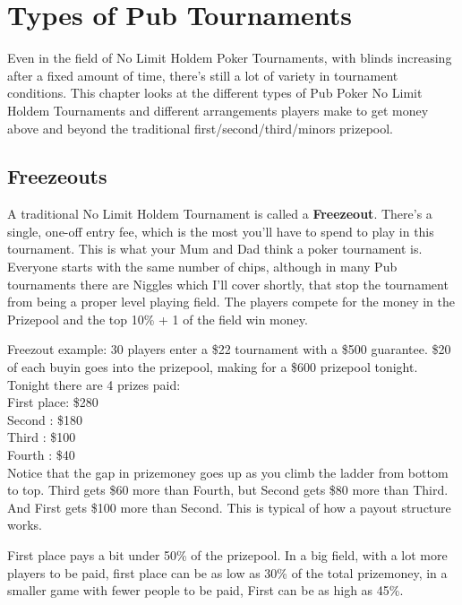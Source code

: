 \chapter{Types of Pub Tournaments}


Even in the field of No Limit Holdem Poker Tournaments,
with blinds increasing after a fixed amount of time, there's still a
lot of variety in tournament conditions. This chapter
looks at the different types of Pub Poker No Limit Holdem Tournaments
and different arrangements players make to get money above and
beyond the traditional first/second/third/minors prizepool.

\section{Freezeouts}

A traditional No Limit Holdem Tournament is called a \textbf{Freezeout}.
There's a single, one-off entry fee, which is the most you'll have to
spend to play in this tournament. This is what your Mum and Dad
think a poker tournament is. Everyone starts with the same number
of chips, although in many Pub tournaments there are Niggles which
I'll cover shortly, that stop the tournament from being a proper
level playing field. The players compete for the
money in the Prizepool and the top 10\% + 1 of the field win money.

Freezout example: 30 players enter a \$22 tournament with a \$500
guarantee. \$20 of each buyin goes into the prizepool, making for a \$600
prizepool tonight. Tonight there are 4 prizes paid: \\
First place: \$280 \\
Second     : \$180 \\
Third      : \$100 \\
Fourth     :  \$40  \\


Notice that the gap in prizemoney goes up as you climb the ladder
from bottom to top. Third gets \$60 more than Fourth, but Second gets
\$80 more than Third. And First gets \$100 more than Second. This is
typical of how a payout structure works.

First place pays a bit under 50\% of the prizepool. In a
big field, with a lot more players to be paid, first place can
be as low as 30\% of the total prizemoney, in a smaller game with
fewer people to be paid, First can be as high as 45\%.

